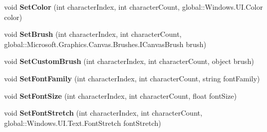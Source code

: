 \begin{DoxyCompactItemize}
\item 
\mbox{\label{class_microsoft_1_1_graphics_1_1_canvas_1_1_text_1_1_canvas_text_layout_a65a724ca04e36e5f0da7f80d7504de49}} 
void {\bfseries Set\+Color} (int character\+Index, int character\+Count, global\+::\+Windows.\+U\+I.\+Color color)
\item 
\mbox{\label{class_microsoft_1_1_graphics_1_1_canvas_1_1_text_1_1_canvas_text_layout_a164e35e922e29d39c04fdf4a859201ff}} 
void {\bfseries Set\+Brush} (int character\+Index, int character\+Count, global\+::\+Microsoft.\+Graphics.\+Canvas.\+Brushes.\+I\+Canvas\+Brush brush)
\item 
\mbox{\label{class_microsoft_1_1_graphics_1_1_canvas_1_1_text_1_1_canvas_text_layout_a9ac1050fa038c2c1ebceaa61d479feb0}} 
void {\bfseries Set\+Custom\+Brush} (int character\+Index, int character\+Count, object brush)
\item 
\mbox{\label{class_microsoft_1_1_graphics_1_1_canvas_1_1_text_1_1_canvas_text_layout_ad4c9f30ce630b285c5de4328a5697eef}} 
void {\bfseries Set\+Font\+Family} (int character\+Index, int character\+Count, string font\+Family)
\item 
\mbox{\label{class_microsoft_1_1_graphics_1_1_canvas_1_1_text_1_1_canvas_text_layout_a2bd8d5f600cfc5fd4da25693e6735264}} 
void {\bfseries Set\+Font\+Size} (int character\+Index, int character\+Count, float font\+Size)
\item 
\mbox{\label{class_microsoft_1_1_graphics_1_1_canvas_1_1_text_1_1_canvas_text_layout_ad50a824a4bfd07dcc357647441ef7b28}} 
void {\bfseries Set\+Font\+Stretch} (int character\+Index, int character\+Count, global\+::\+Windows.\+U\+I.\+Text.\+Font\+Stretch font\+Stretch)
\item 
\mbox{\label{class_microsoft_1_1_graphics_1_1_canvas_1_1_text_1_1_canvas_text_layout_aa0cb0934c99cab9f6563ad3c1652fe2d}} 

\end{DoxyCompactItemize}
